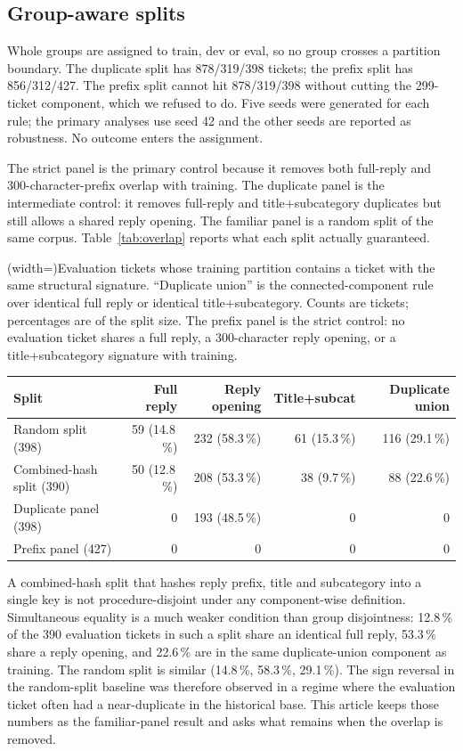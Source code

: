 \subsection{Group-aware splits}
Whole groups are assigned to train, dev or eval, so no group crosses a partition
boundary. The duplicate split has 878/319/398 tickets; the prefix split has
856/312/427. The prefix split cannot hit 878/319/398 without cutting the
299-ticket component, which we refused to do. Five seeds were generated for each
rule; the primary analyses use seed 42 and the other seeds are reported as
robustness. No outcome enters the assignment.

The strict panel is the primary control because it removes both full-reply and
300-character-prefix overlap with training. The duplicate panel is the intermediate
control: it removes full-reply and title+subcategory duplicates but still allows a
shared reply opening. The familiar panel is a random split of the same corpus. Table~\ref{tab:overlap} reports what each split actually guaranteed.

\Table[!btp](width=\textwidth){Evaluation tickets whose training partition contains
a ticket with the same structural signature. ``Duplicate union'' is the
connected-component rule over identical full reply or identical title+subcategory.
Counts are tickets; percentages are of the split size. The prefix panel is the
strict control: no evaluation ticket shares a full reply, a 300-character reply
opening, or a title+subcategory signature with training.\label{tab:overlap}}{
\begin{tabular}{@{}lrrrr@{}}
\toprule
Split & Full reply & Reply opening & Title+subcat & Duplicate union \\
\midrule
Random split (398)   & 59 (14.8\,\%) & 232 (58.3\,\%) & 61 (15.3\,\%) & 116 (29.1\,\%) \\
Combined-hash split (390) & 50 (12.8\,\%) & 208 (53.3\,\%) & 38 (9.7\,\%) & 88 (22.6\,\%) \\
Duplicate panel (398)    & 0 & 193 (48.5\,\%) & 0 & 0 \\
Prefix panel (427)       & 0 & 0 & 0 & 0 \\
\bottomrule
\end{tabular}}

A combined-hash split that hashes reply prefix, title and subcategory into a
single key is not procedure-disjoint under any component-wise definition.
Simultaneous equality is a much weaker condition than group disjointness: 12.8\,\%
of the 390 evaluation tickets in such a split share an identical full reply,
53.3\,\% share a reply opening, and 22.6\,\% are in the same duplicate-union
component as training. The random split is similar (14.8\,\%, 58.3\,\%, 29.1\,\%).
The sign reversal in the random-split baseline was therefore observed in a regime
where the evaluation ticket often had a near-duplicate in the historical base. This article keeps those numbers as the familiar-panel result and
asks what remains when the overlap is removed.

